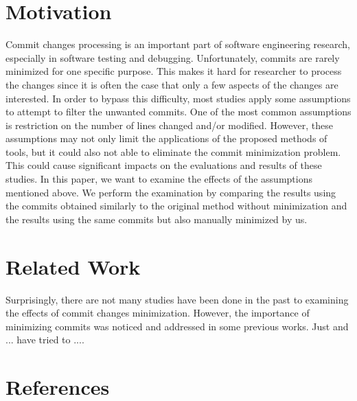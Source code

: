 \section{Motivation}
	Commit changes processing is an important part of software engineering research, especially in software testing and debugging. Unfortunately, commits are rarely minimized for one specific purpose. This makes it hard for researcher to process the changes since it is often the case that only a few aspects of the changes are interested. In order to bypass this difficulty, most studies apply some assumptions to attempt to filter the unwanted commits. One of the most common assumptions is restriction on the number of lines changed and/or modified. However, these assumptions may not only limit the applications of the proposed methods of tools, but it could also not able to eliminate the commit minimization problem. This could cause significant impacts on the evaluations and results of these studies.
	In this paper, we want to examine the effects of the assumptions mentioned above. We perform the examination by comparing the results using the commits obtained similarly to the original method without minimization and  the results using the same commits but also manually minimized by us. 
 
 \section{Related Work}
Surprisingly, there are not many studies have been done in the past to examining the effects of commit changes minimization. However, the importance of minimizing commits was noticed and addressed in some previous works. Just and ... have tried to ....







\section{References}
